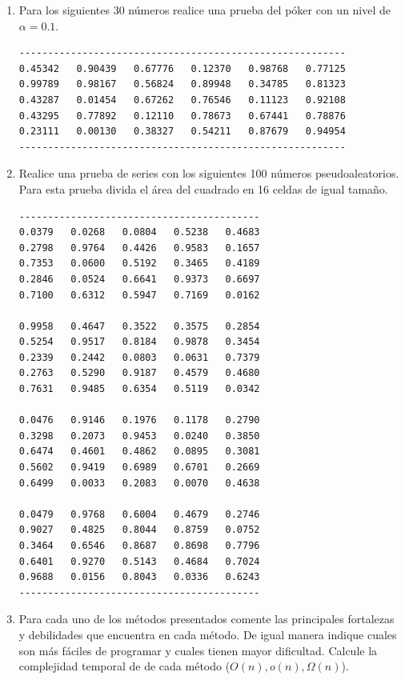 \begin{enumerate}
\begin{enumerate}[label=\alph*.]
\item Realice una prueba de $\chi^2$, con un nivel $\alpha = 0.05$.
\end{enumerate}



\item Para los siguientes 30 números realice una prueba del póker con un nivel de $\alpha = 0.1$.
\begin{verbatim}
---------------------------------------------------------
0.45342   0.90439   0.67776   0.12370   0.98768   0.77125
0.99789   0.98167   0.56824   0.89948   0.34785   0.81323
0.43287   0.01454   0.67262   0.76546   0.11123   0.92108
0.43295   0.77892   0.12110   0.78673   0.67441   0.78876
0.23111   0.00130   0.38327   0.54211   0.87679   0.94954
---------------------------------------------------------
\end{verbatim}



\item Realice una prueba de series con los siguientes 100 números pseudoaleatorios. Para esta prueba divida el área del cuadrado en 16 celdas de igual tamaño.
\begin{verbatim}
------------------------------------------
0.0379   0.0268   0.0804   0.5238   0.4683
0.2798   0.9764   0.4426   0.9583   0.1657
0.7353   0.0600   0.5192   0.3465   0.4189
0.2846   0.0524   0.6641   0.9373   0.6697
0.7100   0.6312   0.5947   0.7169   0.0162

0.9958   0.4647   0.3522   0.3575   0.2854
0.5254   0.9517   0.8184   0.9878   0.3454
0.2339   0.2442   0.0803   0.0631   0.7379
0.2763   0.5290   0.9187   0.4579   0.4680
0.7631   0.9485   0.6354   0.5119   0.0342

0.0476   0.9146   0.1976   0.1178   0.2790
0.3298   0.2073   0.9453   0.0240   0.3850
0.6474   0.4601   0.4862   0.0895   0.3081
0.5602   0.9419   0.6989   0.6701   0.2669
0.6499   0.0033   0.2083   0.0070   0.4638

0.0479   0.9768   0.6004   0.4679   0.2746
0.9027   0.4825   0.8044   0.8759   0.0752
0.3464   0.6546   0.8687   0.8698   0.7796
0.6401   0.9270   0.5143   0.4684   0.7024
0.9688   0.0156   0.8043   0.0336   0.6243
------------------------------------------
\end{verbatim}

\item Para cada uno de los métodos presentados comente las principales fortalezas y debilidades que encuentra en cada método. De igual manera indique cuales son más fáciles de programar y cuales tienen mayor dificultad. Calcule la complejidad temporal de de cada método ($O(n), o(n), \Omega(n)$).

\end{enumerate}
